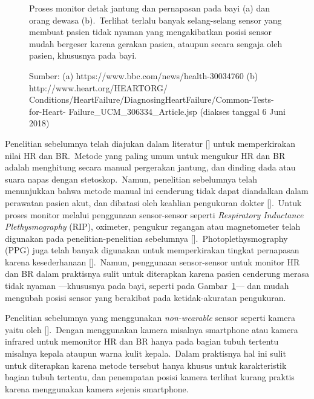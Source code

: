 \begin{figure}[ht]
\begin{subfigure}[b]{0.47\textwidth}
		\caption{}
	\end{subfigure}
	\caption[Proses monitor detak jantung dan pernapasan pada bayi (a) dan orang dewasa (b)]{Proses monitor detak jantung dan pernapasan pada bayi (a) dan orang dewasa (b).~Terlihat terlalu banyak selang-selang sensor yang membuat pasien tidak nyaman yang mengakibatkan posisi sensor mudah bergeser karena gerakan pasien, ataupun secara sengaja oleh pasien, khususnya pada bayi.}
	\caption*{Sumber: (a) https://www.bbc.com/news/health-30034760 (b) http://www.heart.org/HEARTORG/\\Conditions/HeartFailure/DiagnosingHeartFailure/Common-Tests-for-Heart-
		Failure\_UCM\_306334\_Article.jsp (diakses tanggal 6 Juni 2018)}
	\label{fig:pengukuran_jantung}
\end{figure}

Penelitian sebelumnya telah diajukan dalam literatur [\citet{kristjansdottir2004,leonard2006,nilsson2000,nam2014,tarrant1997}] untuk memperkirakan nilai HR dan BR.~Metode yang paling umum untuk mengukur HR dan BR adalah menghitung secara manual pergerakan jantung, dan dinding dada atau suara napas dengan stetoskop.~Namun, penelitian sebelumnya telah menunjukkan bahwa metode manual ini cenderung tidak dapat diandalkan dalam perawatan pasien akut, dan dibatasi oleh keahlian pengukuran dokter [\citet{hillman2005}].~Untuk proses monitor melalui penggunaan sensor-sensor seperti \textit{Respiratory Inductance Plethysmography} (RIP), oximeter, pengukur regangan atau magnetometer telah digunakan pada penelitian-penelitian sebelumnya  [\citet{Mendelson2006,Renevey2001,tarrant1997,Yang1998}].~Photoplethysmography (PPG) juga telah banyak digunakan untuk memperkirakan tingkat pernapasan karena kesederhanaan [\citet{Allen2007,Kamal1989,kristjansdottir2004}].~Namun, penggunaan sensor-sensor untuk monitor HR dan BR dalam praktisnya sulit untuk diterapkan karena pasien cenderung merasa tidak nyaman ---khususnya pada bayi, seperti pada Gambar~\ref{fig:pengukuran_jantung}--- dan mudah mengubah posisi sensor yang berakibat pada ketidak-akuratan pengukuran.

Penelitian sebelumnya yang menggunakan \textit{non-wearable} sensor seperti kamera yaitu oleh [\citet{lazaro2014,nam2014}].~Dengan menggunakan kamera misalnya smartphone atau kamera infrared untuk memonitor HR dan BR hanya pada bagian tubuh tertentu misalnya kepala ataupun warna kulit kepala.~Dalam praktisnya hal ini sulit untuk diterapkan karena metode tersebut hanya khusus untuk karakteristik bagian tubuh tertentu, dan penempatan posisi kamera terlihat kurang praktis karena menggunakan kamera sejenis smartphone.
